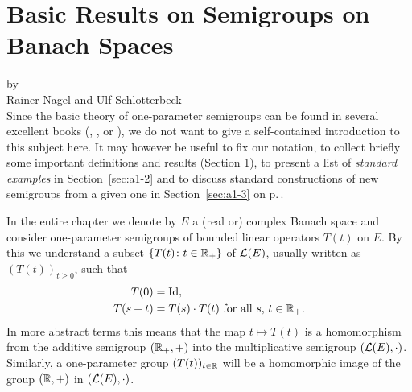 \chapter{Basic Results on Semigroups on Banach Spaces}\label{chap:a1}
{\Large
\vspace*{-.75cm}
by \\[.25em]
Rainer Nagel and Ulf Schlotterbeck 
\vspace{.75cm}
\\
}
Since the basic theory of one-parameter semigroups can be found in several excellent books (\eg \citet{davies:1980}, \citet{goldstein:1985a}, \citet{pazy:1983} or \citet{hillephillips:1957}), we do not want to give a self-contained introduction to this subject here.
It may however be useful to fix our notation, to collect briefly some important definitions and results (Section 1), to present a list of \emph{standard examples} in Section~\ref{sec:a1-2} %
and to discuss standard constructions of new semigroups from a given one in Section~\ref{sec:a1-3} on p.\,\pageref{sec:a1-3}. %

In the entire chapter we denote by $E$ a (real or) complex Banach space and consider one-parameter semigroups of bounded linear operators $T(t)$ on $E$.
By this we understand a subset $\{T(t) \colon  t \in \mathbb{R}_{+}\}$ of $\mathcal{L}(E)$, usually written as $(T(t))_{t\geq0}$, such that
\begin{align*}
	T(0) &= \operatorname{Id}, \\
	T(s+t) &= T(s) \cdot T(t) \text{ for all $s$, $t \in \mathbb{R}_{+}$.}
\end{align*}
In more abstract terms this means that the map $t \mapsto T(t)$ is a homomorphism from the additive semigroup $(\mathbb{R}_{+},+)$ into the multiplicative semigroup $(\mathcal{L}(E),\cdot)$.
Similarly, a one-parameter group $(T(t))_{t\in\mathbb{R}}$ will be a homomorphic image of the group $(\mathbb{R},+)$ in $(\mathcal{L}(E),\cdot)$.
